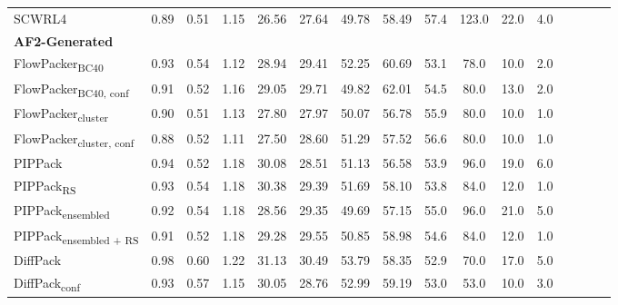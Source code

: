 \begin{table}
{\begin{tabular}{@{}lccccccccccccccc@{}}
                \textnormal{\hspace{0.5cm}SCWRL4} & 0.89 & 0.51 & 1.15 & 26.56 & 27.64 & 49.78 & 58.49 & 57.4 & 123.0 & 22.0 & 4.0 \\
            \textbf{AF2-Generated} & & & & & & & & & \\ 
                \textnormal{\hspace{0.5cm}FlowPacker\textsubscript{BC40}} & 0.93 & 0.54 & 1.12 & 28.94 & 29.41 & 52.25 & 60.69 & 53.1 & 78.0 & 10.0 & 2.0 \\
                \textnormal{\hspace{0.5cm}FlowPacker\textsubscript{BC40, conf}} & 0.91 & 0.52 & 1.16 & 29.05 & 29.71 & 49.82 & 62.01 & 54.5 & 80.0 & 13.0 & 2.0 \\
                \textnormal{\hspace{0.5cm}FlowPacker\textsubscript{cluster}} & 0.90 & 0.51 & 1.13 & 27.80 & 27.97 & 50.07 & 56.78 & 55.9 & 80.0 & 10.0 & 1.0 \\
                \textnormal{\hspace{0.5cm}FlowPacker\textsubscript{cluster, conf}} & 0.88 & 0.52 & 1.11 & 27.50 & 28.60 & 51.29 & 57.52 & 56.6 & 80.0 & 10.0 & 1.0 \\
                \textnormal{\hspace{0.5cm}PIPPack} & 0.94 & 0.52 & 1.18 & 30.08 & 28.51 & 51.13 & 56.58 & 53.9 & 96.0 & 19.0 & 6.0 \\
                \textnormal{\hspace{0.5cm}PIPPack\textsubscript{RS}} & 0.93 & 0.54 & 1.18 & 30.38 & 29.39 & 51.69 & 58.10 & 53.8 & 84.0 & 12.0 & 1.0 \\
                \textnormal{\hspace{0.5cm}PIPPack\textsubscript{ensembled}} & 0.92 & 0.54 & 1.18 & 28.56 & 29.35 & 49.69 & 57.15 & 55.0 & 96.0 & 21.0 & 5.0 \\
                \textnormal{\hspace{0.5cm}PIPPack\textsubscript{ensembled + RS}} & 0.91 & 0.52 & 1.18 & 29.28 & 29.55 & 50.85 & 58.98 & 54.6 & 84.0 & 12.0 & 1.0 \\
                \textnormal{\hspace{0.5cm}DiffPack} & 0.98 & 0.60 & 1.22 & 31.13 & 30.49 & 53.79 & 58.35 & 52.9 & 70.0 & 17.0 & 5.0 \\
                \textnormal{\hspace{0.5cm}DiffPack\textsubscript{conf}} & 0.93 & 0.57 & 1.15 & 30.05 & 28.76 & 52.99 & 59.19 & 53.0 & 53.0 & 10.0 & 3.0 \\

\end{tabular}}
\end{table}
